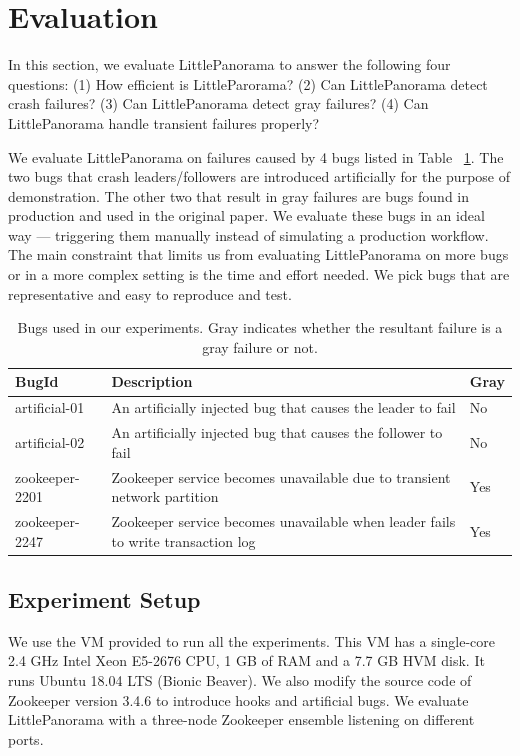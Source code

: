 \newpage
\section{Evaluation}
In this section, we evaluate LittlePanorama to answer the following four questions: (1) How efficient is LittleParorama? (2) Can LittlePanorama detect crash failures? (3) Can LittlePanorama detect gray failures? (4) Can LittlePanorama handle transient failures properly?

We evaluate LittlePanorama on failures caused by 4 bugs listed in Table ~\ref{tab:failures}. The two bugs that crash leaders/followers are introduced artificially for the purpose of demonstration. The other two that result in gray failures are bugs found in production and used in the original paper. We evaluate these bugs in an ideal way --- triggering them manually instead of simulating a production workflow. The main constraint that limits us from evaluating LittlePanorama on more bugs or in a more complex setting is the time and effort needed. We pick bugs that are representative and easy to reproduce and test.

\begin{table}[!tb]
\begin{tabular}{p{}p{}p{}}%

\toprule
\textbf{BugId} & \textbf{Description} & \textbf{Gray} \\
\midrule
  artificial-01   &    An artificially injected bug that causes the leader to fail  &  No  \\
 artificial-02      &   An artificially injected bug that causes the follower to fail  &  No  \\  
zookeeper-2201      &   Zookeeper service becomes unavailable due to transient network partition &  Yes \\
zookeeper-2247      &   Zookeeper service becomes unavailable when leader fails to write transaction log &  Yes \\
\bottomrule
\end{tabular}
\vspace{0.5em}
\caption{Bugs used in our experiments. Gray indicates whether the resultant failure is a gray failure or not.}
\label{tab:failures}
\end{table}


\subsection{Experiment Setup}
We use the VM provided to run all the experiments. This VM has a single-core 2.4 GHz Intel Xeon E5-2676 CPU, 1 GB of RAM and a 7.7 GB HVM disk. It runs Ubuntu 18.04 LTS (Bionic Beaver). We also modify the source code of Zookeeper version 3.4.6 to introduce hooks and artificial bugs. We evaluate LittlePanorama with a three-node Zookeeper ensemble listening on different ports.

